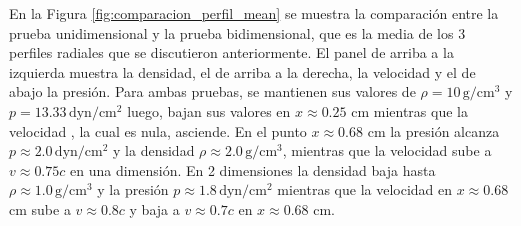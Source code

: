 \documentclass[12pt,a4paper]{book}
\begin{document}
En la Figura \ref{fig:comparacion_perfil_mean} se muestra la comparación entre la prueba unidimensional
y la prueba bidimensional, que es la media de los 3 perfiles radiales que se discutieron anteriormente.
El panel de arriba a la izquierda muestra la densidad, el de arriba a la derecha, la velocidad y 
el de abajo la presión. Para ambas pruebas, se mantienen sus valores de 
$\rho = 10 \,  \text{g}/ \text{cm}^3$ y $p = 13.33 \,  \text{dyn}/ \text{cm}^2 $ 
luego, bajan sus valores en $x \approx 0.25$ cm
mientras que la velocidad , la cual es nula,
asciende. En el punto $x \approx 0.68$ cm la presión alcanza 
$p \approx 2.0\,  \text{dyn}/ \text{cm}^2 $ y la densidad
$\rho \approx 2.0 \,  \text{g}/ \text{cm}^3$, mientras que la velocidad sube a $v \approx 0.75c$
en una dimensión. En 2 dimensiones la densidad baja hasta  $\rho \approx 1.0 \,  \text{g}/ \text{cm}^3$ y
la presión $p \approx 1.8\,  \text{dyn}/ \text{cm}^2 $ mientras que la velocidad en $x \approx 0.68$ cm
sube a $v \approx 0.8c$ y baja a $v \approx 0.7c$ en $x \approx 0.68$ cm.
\end{document}
